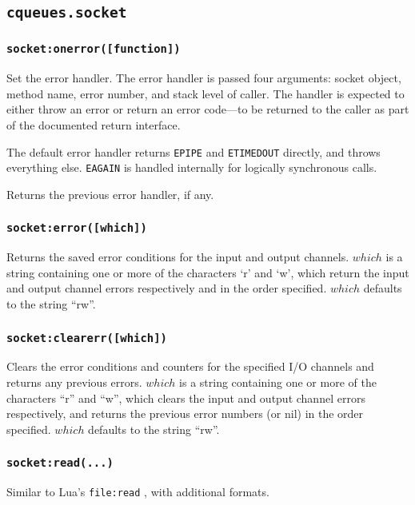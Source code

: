 \documentclass[11pt, oneside]{memoir}
\newcommand{\fn}[1]{\texttt{#1} }
\newcommand{\errno}[1]{\texttt{#1} }
\newcounter{toccols}
\newenvironment{Module}[1]{
	\subsection{\texttt{#1}}
	\addtocontents{toc}{
		\protect\begin{multicols}{\value{toccols}}
	}
}{
	\addtocontents{toc}{\protect\end{multicols}}
}
\begin{document}
\begin{Module}{cqueues.socket}
\subsubsection[\fn{socket:onerror}]{\fn{socket:onerror([function])}}
Set the error handler. The error handler is passed four arguments: socket object, method name, error number, and stack level of caller. The handler is expected to either throw an error or return an error code---to be returned to the caller as part of the documented return interface.

The default error handler returns \errno{EPIPE} and \errno{ETIMEDOUT} directly, and throws everything else. \errno{EAGAIN} is handled internally for logically synchronous calls.

Returns the previous error handler, if any.

\subsubsection[\fn{socket:error}]{\fn{socket:error([which])}}

Returns the saved error conditions for the input and output channels. $which$ is a string containing one or more of the characters `r' and `w', which return the input and output channel errors respectively and in the order specified. $which$ defaults to the string ``rw''.

\subsubsection[\fn{socket:clearerr}]{\fn{socket:clearerr([which])}}

Clears the error conditions and counters for the specified I/O channels and returns any previous errors. $which$ is a string containing one or more of the characters ``r'' and ``w'', which clears the input and output channel errors respectively, and returns the previous error numbers (or nil) in the order specified. $which$ defaults to the string ``rw''.

\subsubsection[\fn{socket:read}]{\fn{socket:read(...)}}
Similar to Lua's \fn{file:read}, with additional formats.


\end{Module}
\end{document}
